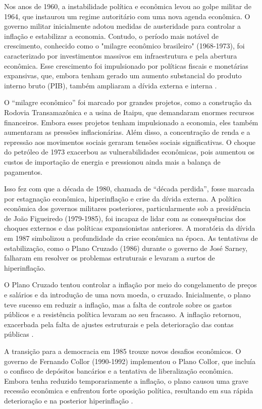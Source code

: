 \documentclass[12pt,oneside,a4paper,chapter=TITLE,english,brazil,sumario=abnt-6027-2012]{abntex2}
\begin{document}
Nos anos de 1960, a instabilidade política e econômica levou ao golpe militar de 1964, que instaurou um regime autoritário com uma nova agenda econômica. O governo militar inicialmente adotou medidas de austeridade para controlar a inflação e estabilizar a economia. Contudo, o período mais notável de crescimento, conhecido como o "milagre econômico brasileiro" (1968-1973), foi caracterizado por investimentos massivos em infraestrutura e pela abertura econômica. Esse crescimento foi impulsionado por políticas fiscais e monetárias expansivas, que, embora tenham gerado um aumento substancial do produto interno bruto (PIB), também ampliaram a dívida externa e interna \cite{amaurypatrickgremaud_2009_economia}.

O ``milagre econômico'' foi marcado por grandes projetos, como a construção da Rodovia Transamazônica e a usina de Itaipu, que demandaram enormes recursos financeiros. Embora esses projetos tenham impulsionado a economia, eles também aumentaram as pressões inflacionárias. Além disso, a concentração de renda e a repressão aos movimentos sociais geraram tensões sociais significativas. O choque do petróleo de 1973 exacerbou as vulnerabilidades econômicas, pois aumentou os custos de importação de energia e pressionou ainda mais a balança de pagamentos.

Isso fez com que a década de 1980, chamada de ``década perdida'', fosse marcada por estagnação econômica, hiperinflação e crise da dívida externa. A política econômica dos governos militares posteriores, particularmente sob a presidência de João Figueiredo (1979-1985), foi incapaz de lidar com as consequências dos choques externos e das políticas expansionistas anteriores. A moratória da dívida em 1987 simbolizou a profundidade da crise econômica \cite{fabiogiambiagi_2016_economia} na época. As tentativas de estabilização, como o Plano Cruzado (1986) durante o governo de José Sarney, falharam em resolver os problemas estruturais e levaram a surtos de hiperinflação.

O Plano Cruzado tentou controlar a inflação por meio do congelamento de preços e salários e da introdução de uma nova moeda, o cruzado. Inicialmente, o plano teve sucesso em reduzir a inflação, mas a falta de controle sobre os gastos públicos e a resistência política levaram ao seu fracasso. A inflação retornou, exacerbada pela falta de ajustes estruturais e pela deterioração das contas públicas \cite{fabiogiambiagi_1999_a}.

A transição para a democracia em 1985 trouxe novos desafios econômicos. O governo de Fernando Collor (1990-1992) implementou o Plano Collor, que incluía o confisco de depósitos bancários e a tentativa de liberalização econômica. Embora tenha reduzido temporariamente a inflação, o plano causou uma grave recessão econômica e enfrentou forte oposição política, resultando em sua rápida deterioração e na posterior hiperinflação \cite{lacerda_2010_economia}.
\end{document}
